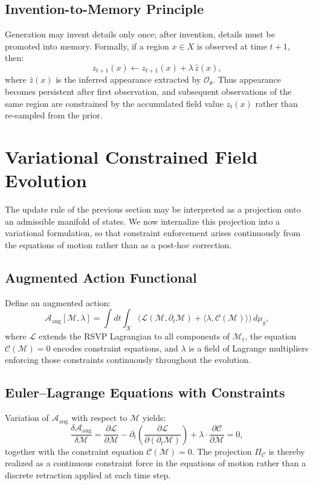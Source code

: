 \documentclass[11pt]{article}
\begin{document}
\subsection{Invention-to-Memory Principle}

Generation may invent details only once; after invention, details must be
promoted into memory.
Formally, if a region $x \in X$ is observed at time $t+1$, then:
\[
z_{t+1}(x) \gets z_{t+1}(x) + \lambda\, \hat{z}(x),
\]
where $\hat{z}(x)$ is the inferred appearance extracted by
$\mathcal{O}_\theta$.
Thus appearance becomes persistent after first observation, and subsequent
observations of the same region are constrained by the accumulated field
value $z_t(x)$ rather than re-sampled from the prior.

\section{Variational Constrained Field Evolution}

The update rule of the previous section may be interpreted as a projection
onto an admissible manifold of states.
We now internalize this projection into a variational formulation, so that
constraint enforcement arises continuously from the equations of motion
rather than as a post-hoc correction.

\subsection{Augmented Action Functional}

Define an augmented action:
\[
\mathcal{A}_{\text{aug}}[\mathcal{M},\lambda]
=
\int dt \int_X
\Big(
\mathcal{L}(\mathcal{M}, \partial_t \mathcal{M})
+
\langle \lambda, \mathcal{C}(\mathcal{M}) \rangle
\Big)\, d\mu_g,
\]
where $\mathcal{L}$ extends the RSVP Lagrangian to all components of
$\mathcal{M}_t$, the equation $\mathcal{C}(\mathcal{M})=0$ encodes
constraint equations, and $\lambda$ is a field of Lagrange multipliers
enforcing those constraints continuously throughout the evolution.

\subsection{Euler--Lagrange Equations with Constraints}

Variation of $\mathcal{A}_{\text{aug}}$ with respect to $\mathcal{M}$
yields:
\[
\frac{\delta \mathcal{A}_{\text{aug}}}{\delta \mathcal{M}}
=
\frac{\partial \mathcal{L}}{\partial \mathcal{M}}
-
\partial_t \left(\frac{\partial \mathcal{L}}{\partial (\partial_t \mathcal{M})}\right)
+
\lambda \cdot \frac{\partial \mathcal{C}}{\partial \mathcal{M}}
= 0,
\]
together with the constraint equation $\mathcal{C}(\mathcal{M}) = 0$.
The projection $\Pi_{\mathcal{C}}$ is thereby realized as a continuous
constraint force in the equations of motion rather than a discrete
retraction applied at each time step.
\end{document}
